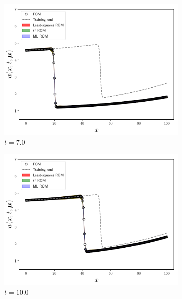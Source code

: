 \documentclass[3p,computermodern,10pt]{elsarticle}
\begin{document}
\begin{figure}
\begin{center}
\begin{subfigure}[t]{0.24\textwidth}
\includegraphics[trim={0cm 0cm 0cm 0cm},clip,width=1.0\linewidth]{code/burgers/synapse_models/elu/results/usol_0001.pdf} 
\caption{$t=7.0$}
\end{subfigure}
\begin{subfigure}[t]{0.24\textwidth}
\includegraphics[trim={0cm 0cm 0cm 0cm},clip,width=1.0\linewidth]{code/burgers/synapse_models/elu/results/usol_0003.pdf} 
\caption{$t=10.0$}
\end{subfigure}
\begin{subfigure}[t]{0.24\textwidth}

\end{subfigure}
\end{center}
\end{figure}
\end{document}
